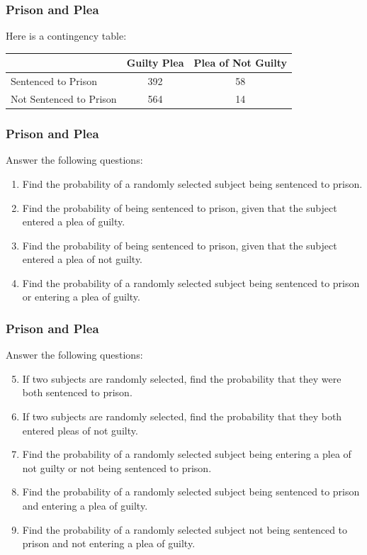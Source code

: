 \documentclass[xcolor=dvipsnames]{beamer}
\begin{document}
\begin{frame}
  \frametitle{Prison and Plea}
Here is a contingency table:
\begin{tabular}{|l|c|c|}\hline
  & Guilty Plea & Plea of Not Guilty \\ \hline
  Sentenced to Prison & 392 & 58 \\ \hline
  Not Sentenced to Prison & 564 & 14 \\ \hline
\end{tabular}
\end{frame}

\begin{frame}
  \frametitle{Prison and Plea}
Answer the following questions:
\begin{enumerate}
\item Find the probability of a randomly selected subject being
  sentenced to prison.
\item Find the probability of being sentenced to prison, given
  that the subject entered a plea of guilty.
\item Find the probability of being sentenced to prison, given
  that the subject entered a plea of not guilty.
\item Find the probability of a randomly selected subject being
  sentenced to prison or entering a plea of guilty.
\end{enumerate}
\end{frame}

\begin{frame}
  \frametitle{Prison and Plea}
Answer the following questions:
\begin{enumerate}
\setcounter{enumi}{4}
\item If two subjects are randomly selected, find the probability
  that they were both sentenced to prison.
\item If two subjects are randomly selected, find the probability
  that they both entered pleas of not guilty.
\item Find the probability of a randomly selected subject being
  entering a plea of not guilty or not being sentenced to prison.
\item Find the probability of a randomly selected subject being
  sentenced to prison and entering a plea of guilty.
\item Find the probability of a randomly selected subject not being
  sentenced to prison and not entering a plea of guilty.
\end{enumerate}
\end{frame}
\end{document}

